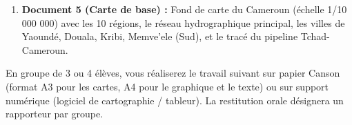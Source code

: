 \documentclass[11pt]{article}
\newcounter{popsec}
\newcounter{popsub}
\newcommand{\courssub}[1]{%
  \stepcounter{popsub}%
  \par\vspace{9pt}\noindent{\popxbold\fontsize{11.5}{13}\selectfont\color{popink}{\color{poporange}\thepopsec.\thepopsub}\hspace{6pt}#1}\par\nopagebreak\vspace{4pt}
}
\begin{document}
\begin{enumerate}
\begin{itemize}
        \item \textit{Photo B :} Barrage hydroélectrique de Memve'ele (mis en service 2019), construit par \emph{Sinohydro}, financé par prêt concessionnel chinois. Puissance : 211 MW. Ligne de transport 225 kV vers Yaoundé.
        \item \textit{Photo C :} Échangeur de Nsimalen (Yaoundé) / Palais des Congrès de Yaoundé (rénové/construit par entreprises chinoises), symbolisant l'urbanisme et la diplomatie.
    \end{itemize}
    \item \textbf{Document 5 (Carte de base) :} Fond de carte du Cameroun (échelle 1/10 000 000) avec les 10 régions, le réseau hydrographique principal, les villes de Yaoundé, Douala, Kribi, Memve'ele (Sud), et le tracé du pipeline Tchad-Cameroun.
\end{enumerate}

\courssub{Consignes}
En groupe de 3 ou 4 élèves, vous réaliserez le travail suivant sur papier Canson (format A3 pour les cartes, A4 pour le graphique et le texte) ou sur support numérique (logiciel de cartographie / tableur). La restitution orale désignera un rapporteur par groupe.
\end{document}
